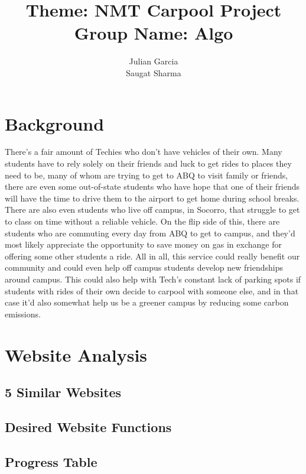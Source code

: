 \documentclass[10pt]{article}
\title{Theme: NMT Carpool Project \\ Group Name: Algo}
\author{Julian Garcia \\ Saugat Sharma}
\begin{document}
\maketitle

\section{Background}
There's a fair amount of Techies who don’t have vehicles of their own. Many students have to rely solely on their friends and luck to get rides to places they need to be, many of whom are trying to get to ABQ to visit family or friends, there are even some out-of-state students who have hope that one of their friends will have the time to drive them to the airport to get home during school breaks.  There are also even students who live off campus, in Socorro, that struggle to get to class on time without a reliable vehicle. On the flip side of this, there are students who are commuting every day from ABQ to get to campus, and they'd most likely appreciate the opportunity to save money on gas in exchange for offering some other students a ride. All in all, this service could really benefit our community and could even help off campus students develop new friendships around campus. This could also help with Tech’s constant lack of parking spots if students with rides of their own decide to carpool with someone else, and in that case it'd also somewhat help us be a greener campus by reducing some carbon emissions.

\section{Website Analysis}

\subsection{5 Similar Websites}

\subsection{Desired Website Functions}
\subsection{Progress Table}

\begin{table}[h!]
\end{table}
\end{document}
